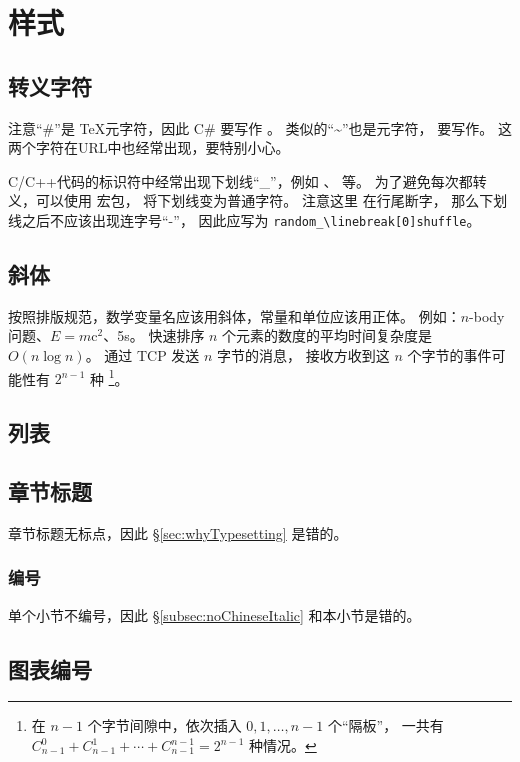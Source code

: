 \chapter{样式}

\section{转义字符}
注意“\#”是 \TeX 元字符，因此 C\# 要写作 。
类似的“\textasciitilde”也是元字符，
要写作。
这两个字符在URL中也经常出现，要特别小心。

C/C++代码的标识符中经常出现下划线“_”，例如 、
 等。
为了避免每次都转义，可以使用  宏包，
将下划线变为普通字符。
注意这里  在行尾断字，
那么下划线之后不应该出现连字号“-”，
因此应写为 \verb|random_\linebreak[0]shuffle|。

\section{斜体}
按照排版规范，数学变量名应该用斜体，常量和单位应该用正体。
例如：$n$-body 问题、$E = m \mathrm{c}^2 $、5\textmu s。
快速排序 $n$ 个元素的数度的平均时间复杂度是 $O(n \log n)$。
通过 TCP 发送 $n$ 字节的消息，
接收方收到这 $n$ 个字节的事件可能性有 $2^{n-1}$ 种
\footnote{在 $n-1$ 个字节间隙中，依次插入 $0, 1, \ldots, n-1$ 个“隔板”，
一共有 $C_{n-1}^0 + C_{n-1}^1 + \cdots + C_{n-1}^{n-1} = 2 ^ {n-1} $ 种情况。}。

\section{列表}

\section{章节标题}
章节标题无标点，因此 \S \ref{sec:whyTypesetting} 是错的。

\subsection{编号}
单个小节不编号，因此 \S \ref{subsec:noChineseItalic} 和本小节是错的。

\section{图表编号}

